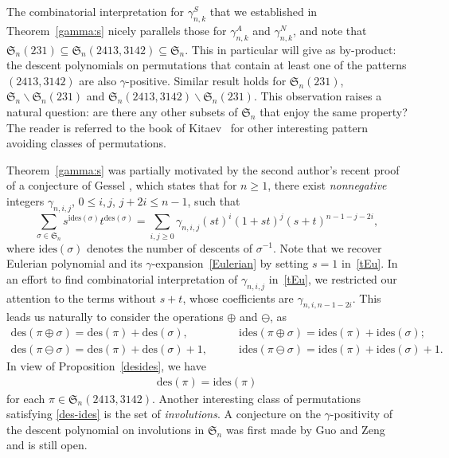 \documentclass[12pt]{amsart}
\numberwithin{equation}{section}
\theoremstyle{plain}
\theoremstyle{definition}
\def\des{\mathrm{des}}
\def\S{\mathfrak{S}}
\def\ides{\mathrm{ides}}
\begin{document}
 The combinatorial interpretation for $\gamma_{n,k}^S$ that we established in Theorem~\ref{gamma:s} nicely parallels those for $\gamma_{n,k}^A$ and $\gamma_{n,k}^N$, and note that $\S_n(231)\subseteq\S_n(2413,3142)\subseteq\S_n$. This in particular will give as by-product: the descent polynomials on permutations that contain at least one of the patterns $(2413,3142)$ are also $\gamma$-positive. Similar result holds for  $\S_n(231)$, $\S_n\backslash\S_n(231)$ and $\S_n(2413,3142)\backslash\S_n(231)$. This observation raises a natural question: are there any other subsets  of $\S_n$ that enjoy the same property? The reader is referred to the book of Kitaev~\cite{ki} for other interesting pattern avoiding classes of permutations.


Theorem~\ref{gamma:s} was partially motivated  by the second author's recent proof~\cite{lin} of 
a conjecture of 
Gessel \cite{br},  which  states that for $n\geq 1$, there exist \emph{nonnegative} integers $\gamma_{n,i,j}$, $0\leq i,j$, $j+2i\leq n-1$, such that 
\begin{equation}
\label{tEu}
\sum_{\sigma\in \S_n}s^{\ides(\sigma)}t^{\des(\sigma)}
= \sum_{i,j\geq 0}\gamma_{n,i,j}(st)^i(1+st)^j(s+t)^{n-1-j-2i},
\end{equation}
where $\ides(\sigma)$ denotes the number of descents of $\sigma^{-1}$.
Note that we recover Eulerian polynomial and its $\gamma$-expansion~\eqref{Eulerian} by 
setting $s=1$ in~\eqref{tEu}. 
In an effort to find combinatorial interpretation of $\gamma_{n,i,j}$ in~\eqref{tEu}, we restricted our attention to the terms without $s+t$, whose coefficients are $\gamma_{n,i,n-1-2i}$. This  leads us naturally to consider the operations $\oplus$ and $\ominus$, as 
 \begin{align*}
\des(\pi\oplus\sigma)=\des(\pi)+\des(\sigma),\qquad & \ides(\pi\oplus\sigma)=\ides(\pi)+\ides(\sigma);\\
\des(\pi\ominus\sigma)=\des(\pi)+\des(\sigma)+1,\qquad & \ides(\pi\ominus\sigma)=\ides(\pi)+\ides(\sigma)+1.
\end{align*}
In view of Proposition~\ref{desides}, we have 
\begin{align}\label{des-ides}
\des(\pi)=\ides(\pi)
\end{align}
for each $\pi\in\S_n(2413,3142)$.   Another  interesting 
class of permutations satisfying \eqref{des-ides}  is the set of  {\em involutions}.  A conjecture on the $\gamma$-positivity of the descent polynomial on involutions 
in $\S_n$ 
 was first made by Guo and Zeng~\cite{gz} and   is  still open.
 
\end{document}

